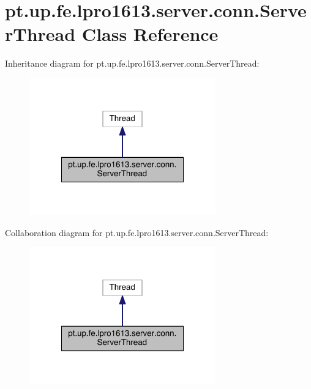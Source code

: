 \hypertarget{classpt_1_1up_1_1fe_1_1lpro1613_1_1server_1_1conn_1_1_server_thread}{}\section{pt.\+up.\+fe.\+lpro1613.\+server.\+conn.\+Server\+Thread Class Reference}
\label{classpt_1_1up_1_1fe_1_1lpro1613_1_1server_1_1conn_1_1_server_thread}


Inheritance diagram for pt.\+up.\+fe.\+lpro1613.\+server.\+conn.\+Server\+Thread\+:
\nopagebreak
\begin{figure}[H]
\begin{center}
\leavevmode
\includegraphics[width=228pt]{classpt_1_1up_1_1fe_1_1lpro1613_1_1server_1_1conn_1_1_server_thread__inherit__graph}
\end{center}
\end{figure}


Collaboration diagram for pt.\+up.\+fe.\+lpro1613.\+server.\+conn.\+Server\+Thread\+:
\nopagebreak
\begin{figure}[H]
\begin{center}
\leavevmode
\includegraphics[width=228pt]{classpt_1_1up_1_1fe_1_1lpro1613_1_1server_1_1conn_1_1_server_thread__coll__graph}
\end{center}
\end{figure}
